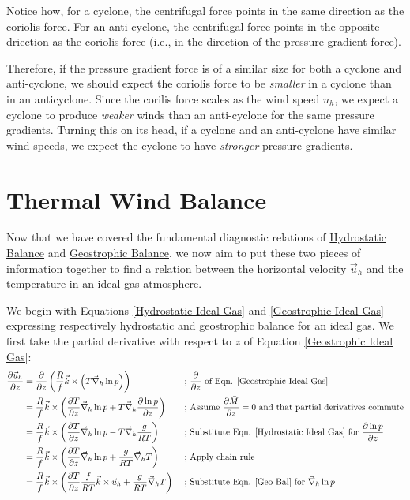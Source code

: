 Notice how, for a cyclone, the centrifugal force points in the same direction as the coriolis force. For an anti-cyclone, the centrifugal force points in the opposite driection as the coriolis force (i.e., in the direction of the pressure gradient force).

Therefore, if the pressure gradient force is of a similar size for both a cyclone and anti-cyclone, we should expect the coriolis force to be \textit{smaller} in a cyclone than in an anticyclone. Since the corilis force scales as the wind speed $u_h$, we expect a cyclone to produce \textit{weaker} winds than an anti-cyclone for the same pressure gradients. Turning this on its head, if a cyclone and an anti-cyclone have similar wind-speeds, we expect the cyclone to have \textit{stronger} pressure gradients.

\section{Thermal Wind Balance}

Now that we have covered the fundamental diagnostic relations of \hyperref[Hydrostatic GFD Box]{Hydrostatic Balance} and \hyperref[Geostrophic Box]{Geostrophic Balance}, we now aim to put these two pieces of information together to find a relation between the horizontal velocity $\vec{u}_h$ and the temperature in an ideal gas atmosphere.

We begin with Equations \ref{Hydrostatic Ideal Gas} and \ref{Geostrophic Ideal Gas} expressing respectively hydrostatic and geostrophic balance for an ideal gas. We first take the partial derivative with respect to $z$ of Equation \ref{Geostrophic Ideal Gas}:
\begin{align*}
    \frac{\partial\vec{u}_h}{\partial z}&=\frac{\partial}{\partial z} \left( \frac{R}{f}\vec{k}\times \left( T\vec{\nabla}_h \ln p \right) \right)
    &
    \text{ ; }
    &
    \frac{\partial}{\partial z}\text{ of Eqn. \ref{Geostrophic Ideal Gas}}
    \\
    &=\frac{R}{f}\vec{k}\times\left( 
        \frac{\partial T}{\partial z}\vec{\nabla}_h \ln p
        +
        T\vec{\nabla}_h \frac{\partial \ln p}{\partial z}
     \right)
    &
    \text{ ; }
    &
    \text{Assume }\frac{\partial \bar{M}}{\partial z}=0\text{ and that partial derivatives commute}
    \\
    &=\frac{R}{f}\vec{k}\times\left( 
        \frac{\partial T}{\partial z}\vec{\nabla}_h \ln p
        -
        T\vec{\nabla}_h \frac{g}{RT}
    \right)
    &
    \text{ ; }
    &
    \text{Substitute Eqn. \ref{Hydrostatic Ideal Gas} for }\frac{\partial \ln p}{\partial z}
    \\
    &=\frac{R}{f}\vec{k}\times\left( 
        \frac{\partial T}{\partial z}\vec{\nabla}_h \ln p
        +
        \frac{g}{RT}
        \vec{\nabla}_h T
    \right)
    &
    \text{ ; }
    &
    \text{Apply chain rule}
    \\
    &=\frac{R}{f}\vec{k}\times\left( 
        \frac{\partial T}{\partial z}\frac{f}{RT} \vec{k}\times\vec{u}_h
        +
        \frac{g}{RT}
        \vec{\nabla}_h T
    \right)
    &
    \text{ ; }
    &
    \text{Substitute Eqn. \ref{Geo Bal} for }\vec{\nabla}_h\ln p
\end{align*}

